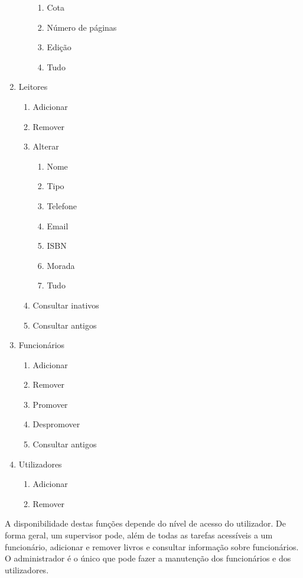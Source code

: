 \documentclass[12pt,a4paper,reqno]{report}
\numberwithin{figure}{section}
\numberwithin{equation}{section}
\begin{document}
\begin{enumerate}
\begin{enumerate}[label*=\arabic*.]
\begin{enumerate}[label*=\arabic*.]
		\item Cota
		\item Número de páginas
		\item Edição
		\item Tudo
	\end{enumerate}
  \end{enumerate}
  \item Leitores
  \begin{enumerate}[label*=\arabic*.]
    \item Adicionar
    \item Remover
    \item Alterar
	\begin{enumerate}[label*=\arabic*.]
		\item Nome
		\item Tipo
		\item Telefone
		\item Email
		\item ISBN
		\item Morada
		\item Tudo
	\end{enumerate}
	\item Consultar inativos
    \item Consultar antigos
  \end{enumerate}
  \item Funcionários
  \begin{enumerate}[label*=\arabic*.]
    \item Adicionar
    \item Remover
    \item Promover
    \item Despromover
    \item Consultar antigos
  \end{enumerate}
  \item Utilizadores
  \begin{enumerate}[label*=\arabic*.]
    \item Adicionar
    \item Remover
  \end{enumerate}
\end{enumerate}

A disponibilidade destas funções depende do nível de acesso do utilizador. De forma geral, um supervisor pode, além de todas as tarefas acessíveis a um funcionário, adicionar e remover livros e consultar informação sobre funcionários. O administrador é o único que pode fazer a manutenção dos funcionários e dos utilizadores.
\end{document}
